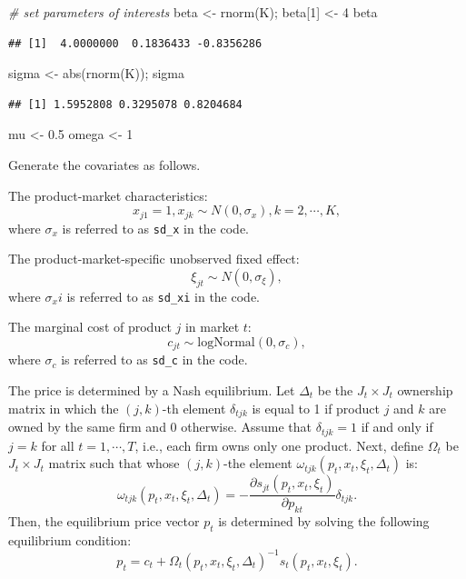\documentclass[
]{book}
\newenvironment{Shaded}{\begin{snugshade}}{\end{snugshade}}
\newcommand{\CommentTok}[1]{\textcolor[rgb]{0.56,0.35,0.01}{\textit{#1}}}
\newcommand{\DecValTok}[1]{\textcolor[rgb]{0.00,0.00,0.81}{#1}}
\newcommand{\FloatTok}[1]{\textcolor[rgb]{0.00,0.00,0.81}{#1}}
\newcommand{\FunctionTok}[1]{\textcolor[rgb]{0.00,0.00,0.00}{#1}}
\newcommand{\NormalTok}[1]{#1}
\newcommand{\OtherTok}[1]{\textcolor[rgb]{0.56,0.35,0.01}{#1}}
\begin{document}
\begin{Shaded}
\begin{Highlighting}[]
\CommentTok{\# set parameters of interests}
\NormalTok{beta }\OtherTok{\textless{}{-}} \FunctionTok{rnorm}\NormalTok{(K); }
\NormalTok{beta[}\DecValTok{1}\NormalTok{] }\OtherTok{\textless{}{-}} \DecValTok{4}
\NormalTok{beta}
\end{Highlighting}
\end{Shaded}

\begin{verbatim}
## [1]  4.0000000  0.1836433 -0.8356286
\end{verbatim}

\begin{Shaded}
\begin{Highlighting}[]
\NormalTok{sigma }\OtherTok{\textless{}{-}} \FunctionTok{abs}\NormalTok{(}\FunctionTok{rnorm}\NormalTok{(K)); sigma}
\end{Highlighting}
\end{Shaded}

\begin{verbatim}
## [1] 1.5952808 0.3295078 0.8204684
\end{verbatim}

\begin{Shaded}
\begin{Highlighting}[]
\NormalTok{mu }\OtherTok{\textless{}{-}} \FloatTok{0.5}
\NormalTok{omega }\OtherTok{\textless{}{-}} \DecValTok{1}
\end{Highlighting}
\end{Shaded}

Generate the covariates as follows.

The product-market characteristics:
\[
x_{j1} = 1, x_{jk} \sim N(0, \sigma_x), k = 2, \cdots, K,
\]
where \(\sigma_x\) is referred to as \texttt{sd\_x} in the code.

The product-market-specific unobserved fixed effect:
\[
\xi_{jt} \sim N(0, \sigma_\xi),
\]
where \(\sigma_xi\) is referred to as \texttt{sd\_xi} in the code.

The marginal cost of product \(j\) in market \(t\):
\[
c_{jt} \sim \text{logNormal}(0, \sigma_c),
\]
where \(\sigma_c\) is referred to as \texttt{sd\_c} in the code.

The price is determined by a Nash equilibrium. Let \(\Delta_t\) be the \(J_t \times J_t\) ownership matrix in which the \((j, k)\)-th element \(\delta_{tjk}\) is equal to 1 if product \(j\) and \(k\) are owned by the same firm and 0 otherwise. Assume that \(\delta_{tjk} = 1\) if and only if \(j = k\) for all \(t = 1, \cdots, T\), i.e., each firm owns only one product. Next, define \(\Omega_t\) be \(J_t \times J_t\) matrix such that whose \((j, k)\)-the element \(\omega_{tjk}(p_t, x_t, \xi_t, \Delta_t)\) is:
\[
\omega_{tjk}(p_t, x_t, \xi_t, \Delta_t) = - \frac{\partial s_{jt}(p_t, x_t, \xi_t)}{\partial p_{kt}} \delta_{tjk}.
\]
Then, the equilibrium price vector \(p_t\) is determined by solving the following equilibrium condition:
\[
p_t = c_t + \Omega_t(p_t, x_t, \xi_t, \Delta_t)^{-1} s_t(p_t, x_t, \xi_t).
\]
\end{document}
